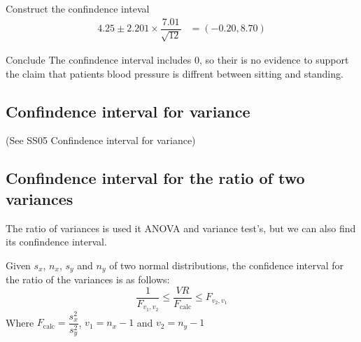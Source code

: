\begin{example}
        \begin{step}{Construct the confindence inteval}
            \begin{align*}
                4.25 \pm 2.201 \times \dfrac{7.01}{\sqrt{12}} &= (-0.20, 8.70)
            \end{align*}
        \end{step}

        \begin{step}{Conclude}
            The confindence interval includes 0, so their is no evidence to support the claim that patients blood pressure is diffrent between sitting and standing.
        \end{step}

        \end{example}

    \subsection{Confindence interval for variance}
        (See SS05 Confindence interval for variance)

    \subsection{Confindence interval for the ratio of two variances}
         The ratio of variances is used it ANOVA and variance test's, but we can also find its confindence interval.

         Given $s_x$, $n_x$, $s_y$ and $n_y$ of two normal distributions, the confidence interval for the ratio of the variances is as follows:
         $$
         \dfrac{1}{F_{v_1, v_2}} \leq \frac{VR}{F_{\text{calc}}} \leq F_{v_2, v_1}
         $$
         Where $F_{\text{calc}} = \dfrac{s_x^2}{s_y^2}$, $v_1 = n_x - 1$ and $v_2 = n_y - 1$

